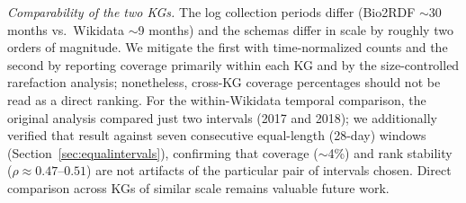 \documentclass[sw]{iosart2x}
\begin{document}
\emph{Comparability of the two KGs.} The log collection periods differ (Bio2RDF $\sim$30 months vs.\ Wikidata $\sim$9 months) and the schemas differ in scale by roughly two orders of magnitude. We mitigate the first with time-normalized counts and the second by reporting coverage primarily within each KG and by the size-controlled rarefaction analysis; nonetheless, cross-KG coverage percentages should not be read as a direct ranking. For the within-Wikidata temporal comparison, the original analysis compared just two intervals (2017 and 2018); we additionally verified that result against seven consecutive equal-length (28-day) windows (Section~\ref{sec:equalintervals}), confirming that coverage ($\sim$4\%) and rank stability ($\rho \approx 0.47$--$0.51$) are not artifacts of the particular pair of intervals chosen. Direct comparison across KGs of similar scale remains valuable future work.
\end{document}
